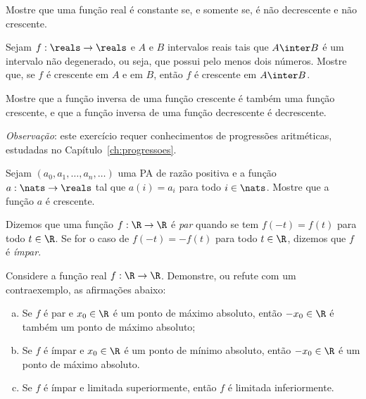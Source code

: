 \begin{exercise}
  Mostre que uma função real é constante se, e somente se, é não decrescente e não crescente.
\end{exercise}

\begin{exercise}
  Sejam $f : \reals \to \reals$ e $A$ e $B$ intervalos reais tais que $A \inter B$ é um intervalo não
  degenerado, ou seja, que possui pelo menos dois números. Mostre que, se $f$ é crescente
  em $A$ e em $B$, então $f$ é crescente em $A\inter B$.
\end{exercise}

\begin{exercise}
\label{exer:inversa-funcao-crescente}
Mostre que a função inversa de uma função crescente é também uma
função crescente, e que a função inversa de uma função decrescente é
decrescente.
\end{exercise}

\begin{exercise}
\textit{Observação}: este exercício requer conhecimentos de progressões
aritméticas, estudadas no Capítulo~\ref{ch:progressoes}.

  Sejam $(a_0,a_1, \dots,a_n,\dots)$ uma PA de razão positiva e a função 
  $a : \nats \to \reals$ tal que $a(i)=a_i$ para todo $i\in\nats$.
  Mostre que a função $a$ é crescente.
\end{exercise}

\begin{exercise}
  Dizemos que uma função $f: \R \to \R$ é \emph{par} quando se tem $f(-t) = f(t)$ para todo $t \in \R$. Se for o caso de $f(-t) = -f(t)$ para todo $t \in \R$, dizemos que $f$ é \emph{ímpar}.

  Considere a função real $f: \R \to \R$. Demonstre, ou refute com um contraexemplo, as afirmações abaixo:
  \begin{enumerate}[a)]
    \item Se $f$ é par e $x_0 \in \R$ é um ponto de máximo absoluto, então $-x_0 \in \R$ é também um ponto de máximo absoluto;
    \item Se $f$ é ímpar e $x_0 \in \R$ é um ponto de mínimo absoluto, então $-x_0 \in \R$ é um ponto de máximo absoluto.
    \item Se $f$ é ímpar e limitada superiormente, então $f$ é limitada inferiormente.
  \end{enumerate}
\end{exercise}

